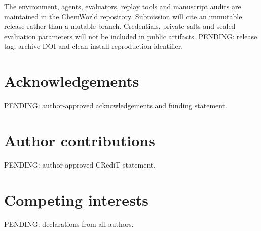 \documentclass[11pt]{article}
\begin{document}
The environment, agents, evaluators, replay tools and manuscript audits are maintained in the ChemWorld repository. Submission will cite an immutable release rather than a mutable branch. Credentials, private salts and sealed evaluation parameters will not be included in public artifacts. \textcolor{pending}{PENDING: release tag, archive DOI and clean-install reproduction identifier.}

\section*{Acknowledgements}

\textcolor{pending}{PENDING: author-approved acknowledgements and funding statement.}

\section*{Author contributions}

\textcolor{pending}{PENDING: author-approved CRediT statement.}

\section*{Competing interests}

\textcolor{pending}{PENDING: declarations from all authors.}



\end{document}
